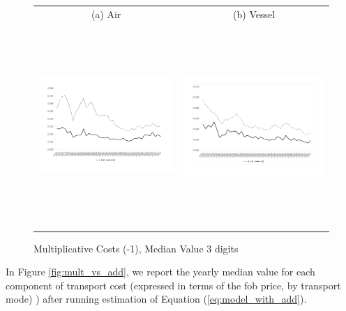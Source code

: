 \documentclass[a4paper,11pt]{article}
\begin{document}
\begin{figure}[htbp]
\caption{Multiplicative Costs (-1), Median Value 3 digits}\label{fig:good_fit}
\begin{center}
\begin{tabular}{cc}
{\small (a) Air } & {\small (b) Vessel}\\
\includegraphics[width=3.5in, height=3in]{graph1a.pdf}
& \includegraphics[width=3.5in,height=3in]{graph1b.pdf} \\
\end{tabular}
\end{center}
\end{figure}

In Figure \ref{fig:mult_vs_add}, we report the yearly median value for each component of transport cost (expressed in terms of the fob price, by transport mode) ) after running estimation of Equation (\ref{eq:model_with_add}).
\end{document}

